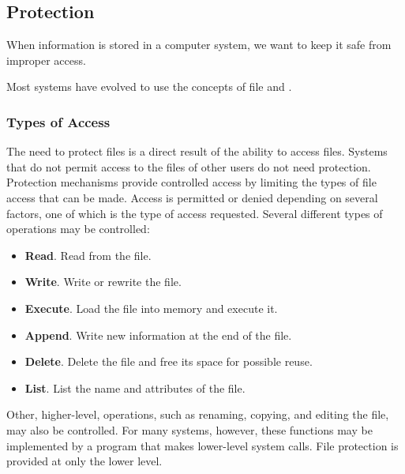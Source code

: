 \subsection{Protection}\label{subsec:File_Protection}
When information is stored in a computer system, we want to keep it safe from improper access.

Most systems have evolved to use the concepts of file  and .

\subsubsection{Types of Access}\label{subsubsec:Types_File_Access}
The need to protect files is a direct result of the ability to access files.
Systems that do not permit access to the files of other users do not need protection.
Protection mechanisms provide controlled access by limiting the types of file access that can be made.
Access is permitted or denied depending on several factors, one of which is the type of access requested.
Several different types of operations may be controlled:
\begin{itemize}[noitemsep]
\item \textbf{Read}.
 Read from the file.
\item \textbf{Write}.
 Write or rewrite the file.
\item \textbf{Execute}.
 Load the file into memory and execute it.
\item \textbf{Append}.
 Write new information at the end of the file.
\item \textbf{Delete}.
 Delete the file and free its space for possible reuse.
\item \textbf{List}.
 List the name and attributes of the file.
\end{itemize}

Other, higher-level, operations, such as renaming, copying, and editing the file, may also be controlled.
For many systems, however, these functions may be implemented by a program that makes lower-level system calls.
File protection is provided at only the lower level.


